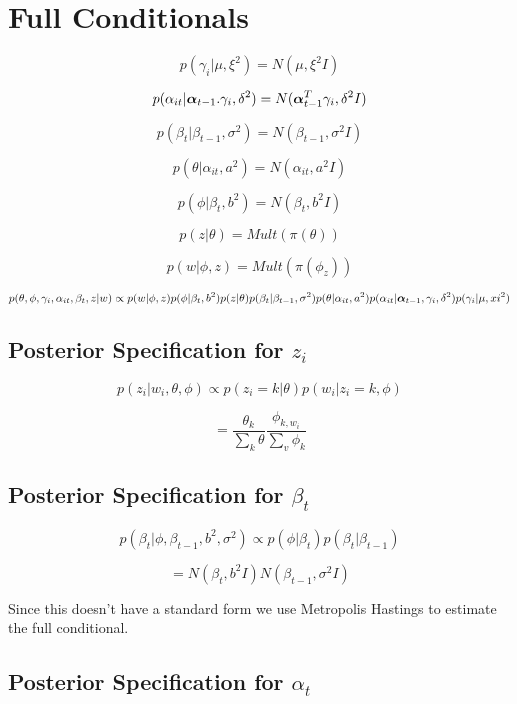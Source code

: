 \documentclass[a4paper]{article}
\begin{document}
\newpage
\appendix

\section{Full Conditionals}

\[p(\gamma_i | \mu, \xi^2) = N(\mu, \xi^2I)\]

\[p(\alpha_{it} | \text{\boldmath$\alpha$}_{t-1}. \gamma_i, \delta^2) = N(\text{\boldmath$\alpha$}^T_{t-1} \gamma_i, \delta^2I)\]

\[p(\beta_t | \beta_{t-1}, \sigma^2) = N(\beta_{t-1}, \sigma^2I)\]

\[p(\theta | \alpha_{it}, a^2) = N(\alpha_{it}, a^2I)\] 

\[p(\phi | \beta_t, b^2) = N(\beta_t, b^2I)\]

\[p(z| \theta) = Mult(\pi(\theta))\]

\[p(w | \phi, z) = Mult(\pi(\phi_z))\]

\[p(\theta, \phi, \gamma_i, \alpha_{it}, \beta_t, z | w) \propto p(w | \phi, z) p(\phi |  \beta_t, b^2)  p(z | \theta)  p(\beta_t | \beta_{t-1}, \sigma^2) p(\theta | \alpha_{it}, a^2) p(\alpha_{it} | \text{\boldmath$\alpha$}_{t-1}, \gamma_i, \delta^2) p(\gamma_i | \mu, xi^2)\]

\subsection{Posterior Specification for $z_i$}

\[p(z_i | w_i, \theta, \phi) \propto p(z_i = k | \theta) p(w_i | z_i = k, \phi)\]

\[= \frac{\theta_k}{\sum_k \theta} \frac{\phi_{k, w_i}}{\sum_v \phi_k}\]

\subsection{Posterior Specification for $\beta_t$}

\[p(\beta_t | \phi, \beta_{t-1}, b^2, \sigma^2) \propto p(\phi | \beta_t) p(\beta_t | \beta_{t-1})\]

\[= N(\beta_t, b^2I) N(\beta_{t-1}, \sigma^2I)\]

Since this doesn't have a standard form we use Metropolis Hastings to estimate the full conditional.

\subsection{Posterior Specification for $\alpha_t$}
\end{document}

